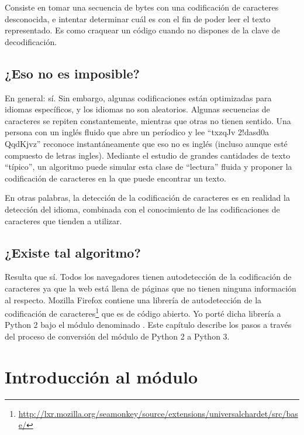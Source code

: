 Consiste en tomar una secuencia de bytes con una codificación de caracteres desconocida, e intentar determinar cuál es con el fin de poder leer el texto representado. Es como craquear un código cuando no dispones de la clave de decodificación.

\subsection{¿Eso no es imposible?}

En general: sí. Sin embargo, algunas codificaciones están optimizadas para idiomas específicos, y los idiomas no son aleatorios. Algunas secuencias de caracteres se repiten constantemente, mientras que otras no tienen sentido. Una persona con un inglés fluido que abre un períodico y lee “txzqJv 2!dasd0a QqdKjvz” reconoce instantáneamente que eso no es inglés (incluso aunque esté compuesto de letras ingles). Mediante el estudio de grandes cantidades de texto “típico”, un algoritmo puede simular esta clase de “lectura” fluida y proponer la codificación de caracteres en la que puede encontrar un texto.

En otras palabras, la detección de la codificación de caracteres es en realidad la detección del idioma, combinada con el conocimiento de las codificaciones de caracteres que tienden a utilizar.

\subsection{¿Existe tal algoritmo?}

Resulta que sí. Todos los navegadores tienen autodetección de la codificación de caracteres ya que la web está llena de páginas que no tienen ninguna información al respecto. Mozilla Firefox contiene una librería de autodetección de la codificación de caracteres\footnote{\href{http://lxr.mozilla.org/seamonkey/source/extensions/universalchardet/src/base/}{http://lxr.mozilla.org/seamonkey/source/extensions/universalchardet/src/base/}} que es de código abierto. Yo porté dicha librería a Python 2 bajo el módulo denominado . Este capítulo describe los pasos a través del proceso de conversión del módulo  de Python 2 a Python 3.

\section{Introducción al módulo }


